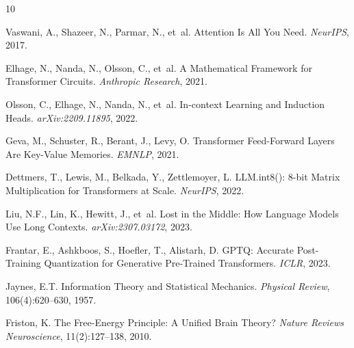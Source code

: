 \documentclass[11pt,a4paper]{article}
\begin{document}

\begin{thebibliography}{10}

Vaswani, A., Shazeer, N., Parmar, N., et~al.
\newblock Attention Is All You Need.
\newblock \emph{NeurIPS}, 2017.

Elhage, N., Nanda, N., Olsson, C., et~al.
\newblock A Mathematical Framework for Transformer Circuits.
\newblock \emph{Anthropic Research}, 2021.

Olsson, C., Elhage, N., Nanda, N., et~al.
\newblock In-context Learning and Induction Heads.
\newblock \emph{arXiv:2209.11895}, 2022.

Geva, M., Schuster, R., Berant, J., Levy, O.
\newblock Transformer Feed-Forward Layers Are Key-Value Memories.
\newblock \emph{EMNLP}, 2021.

Dettmers, T., Lewis, M., Belkada, Y., Zettlemoyer, L.
\newblock LLM.int8(): 8-bit Matrix Multiplication for Transformers at Scale.
\newblock \emph{NeurIPS}, 2022.

Liu, N.F., Lin, K., Hewitt, J., et~al.
\newblock Lost in the Middle: How Language Models Use Long Contexts.
\newblock \emph{arXiv:2307.03172}, 2023.

Frantar, E., Ashkboos, S., Hoefler, T., Alistarh, D.
\newblock GPTQ: Accurate Post-Training Quantization for Generative Pre-Trained Transformers.
\newblock \emph{ICLR}, 2023.

Jaynes, E.T.
\newblock Information Theory and Statistical Mechanics.
\newblock \emph{Physical Review}, 106(4):620--630, 1957.

Friston, K.
\newblock The Free-Energy Principle: A Unified Brain Theory?
\newblock \emph{Nature Reviews Neuroscience}, 11(2):127--138, 2010.

\end{thebibliography}
\end{document}
